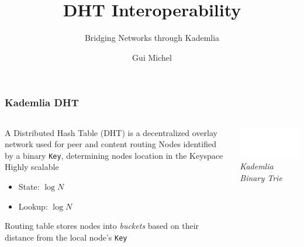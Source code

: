 \documentclass{../shipyard-slide}
\title{DHT Interoperability}
\subtitle{Bridging Networks through Kademlia}
\author{Gui Michel}
\institute{Interplanetary Shipyard}
\date{\DTMdate{2024-07-12}}
\begin{document}
\frame{\titlepage}


\begin{frame}
\frametitle{Kademlia DHT}

\begin{columns}[onlytextwidth]
	\begin{column}{0.64\textwidth}
		\begin{itemize}
			\itemc A Distributed Hash Table (DHT) is a decentralized overlay network used for peer and content routing
			\itemc Nodes identified by a binary \texttt{Key}, determining nodes location in the Keyspace
			\itemc Highly scalable
			\begin{itemize}
				\item[\greencube] State: $\log{N}$
				\item[\greencube] Lookup: $\log{N}$
			\end{itemize}
			\itemc Routing table stores nodes into \textit{buckets} based on their distance from the local node's \texttt{Key}
		\end{itemize}
	\end{column}
		\begin{column}{0.34\textwidth}
    		\begin{center}
        		\includegraphics[width=13em]{resources/kademlia-trie.png}
        		\textit{Kademlia Binary Trie}
    		\end{center}
	\end{column}

\end{columns}
\end{frame}
\end{document}
